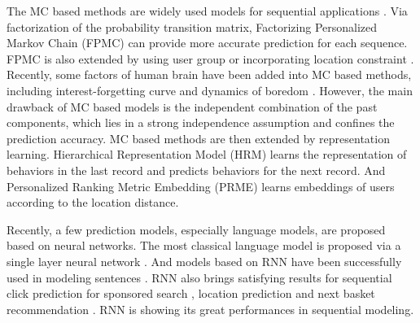 \documentclass[conference]{IEEEtran}
\begin{document}
The MC based methods are widely used models for sequential applications \cite{yang2010personalizing}. Via factorization of the probability transition matrix, Factorizing Personalized Markov Chain (FPMC) \cite{rendle2010factorizing} can provide more accurate prediction for each sequence. FPMC is also extended by using user group \cite{natarajan2013app} or incorporating location constraint \cite{cheng2013you}. Recently, some factors of human brain have been added into MC based methods, including interest-forgetting curve \cite{chen2015personalized} and dynamics of boredom \cite{kapoor2015just}. However, the main drawback of MC based models is the independent combination of the past components, which lies in a strong independence assumption and confines the prediction accuracy. MC based methods are then extended by representation learning. Hierarchical Representation Model (HRM) \cite{wang2015learning} learns the representation of behaviors in the last record and predicts behaviors for the next record. And Personalized Ranking Metric Embedding (PRME) \cite{feng2015personalized} learns embeddings of users according to the location distance.

Recently, a few prediction models, especially language models, are proposed based on neural networks. The most classical language model is proposed via a single layer neural network \cite{bengio2003neural}. And models based on RNN have been successfully used in modeling sentences \cite{mikolov2010recurrent,mikolov2011extensions,mikolov2011rnnlm}. RNN also brings satisfying results for sequential click prediction for sponsored search \cite{zhang2014sequential}, location prediction \cite{liu2016strnn} and next basket recommendation \cite{yu2016dream}. RNN is showing its great performances in sequential modeling.

\end{document}
